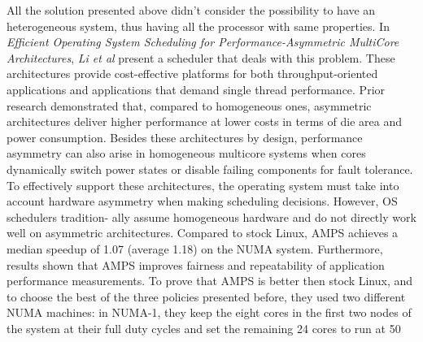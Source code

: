 \documentclass[a4paper,10pt]{article}
\begin{document}
\begin{multicols}{2}
All the solution presented above didn't consider the possibility to have an heterogeneous system, thus having all the processor with same properties. In \emph{Efficient Operating System Scheduling for Performance-Asymmetric MultiCore Architectures}, \emph{Li et al} present a scheduler that deals with this problem. These architectures provide cost-effective platforms for both throughput-oriented applications and applications that demand single thread performance. Prior research \cite{Kumar03single-isaheterogeneous} demonstrated that, compared to homogeneous ones, asymmetric architectures deliver higher performance at lower costs in terms of die area and power consumption. Besides these architectures by design, performance asymmetry can also 
arise in homogeneous multicore systems when cores dynamically switch power states or disable failing components for fault tolerance. To effectively support these architectures, the operating system must take into account hardware asymmetry when making scheduling decisions.  However, OS schedulers tradition-
ally assume homogeneous hardware and do not directly work well on asymmetric architectures. Compared to stock Linux, AMPS achieves a median speedup of 1.07 (average 1.18) on the NUMA system. Furthermore, results shown that AMPS improves fairness and repeatability of application performance measurements. To prove that AMPS is better then stock Linux, and to choose the best of the three policies presented before, they used two different NUMA machines: in NUMA-1, they keep the eight cores in the first two nodes of the system at their full duty cycles and set the remaining 24 cores to run at 50%


\end{multicols}
\end{document}
